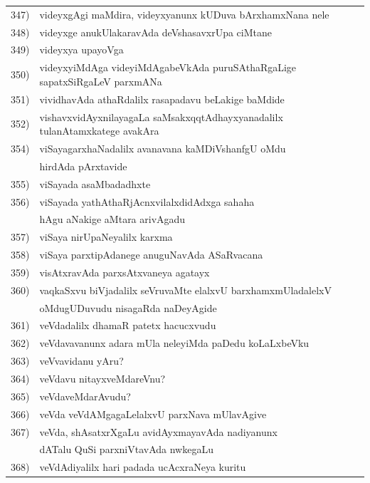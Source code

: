 {\begin{longtable}{@{}cp{7.4cm}r}
347) & videyxgAgi maMdira, videyxyanunx kUDuva bArxhamxNana nele & \pageref{page86}\\
348) & videyxge anukUlakaravAda deVshasavxrUpa ciMtane & \pageref{page93}\\
349) & videyxya upayoVga & \pageref{page86}\\
350) & videyxyiMdAga videyiMdAgabeVkAda puruSAthaRgaLige sapatxSiRgaLeV parxmANa &  \pageref{page89}\\
351) & vividhavAda athaRdalilx rasapadavu beLakige baMdide & \pageref{page217}\\
352) & vishavxvidAyxnilayagaLa saMsakxqqtAdhayxyanadalilx tulanAtamxkatege avakAra & \pageref{page44}\\
354) & viSayagarxhaNadalilx avanavana kaMDiVshanfgU oMdu & \\
     & hirdAda pArxtavide & \pageref{page291}\\
355) &  viSayada asaMbadadhxte & \pageref{page115}\\
356) & viSayada yathAthaRjAcnxvilalxdidAdxga sahaha & \\
     & hAgu aNakige aMtara arivAgadu & \pageref{page194}\\
357) & viSaya nirUpaNeyalilx karxma & \pageref{page131}\\
358) & viSaya parxtipAdanege anuguNavAda ASaRvacana & \pageref{page128}\\
359) & visAtxravAda parxsAtxvaneya agatayx & \pageref{page27}\\ 
360) & vaqkaSxvu biVjadalilx seVruvaMte elalxvU barxhamxmUladalelxV & \\
     & oMdugUDuvudu nisagaRda naDeyAgide & \pageref{page247}\\
361) & veVdadalilx dhamaR patetx hacucxvudu & \pageref{page124}\\
362) & veVdavavanunx adara mUla neleyiMda paDedu koLaLxbeVku & \pageref{page135}\\
363) & veVvavidanu yAru? & \pageref{page133}\\
364) & veVdavu nitayxveMdareVnu? & \pageref{page133}\\
365) & veVdaveMdarAvudu? & \pageref{page132}\\
366) & veVda veVdAMgagaLelalxvU parxNava mUlavAgive & \pageref{page165}\\
367) & veVda, shAsatxrXgaLu avidAyxmayavAda nadiyanunx  & \\
     & dATalu QuSi parxniVtavAda nwkegaLu & \pageref{page42}\\
 368) & veVdAdiyalilx hari padada ucAcxraNeya kuritu & \pageref{page149}\\

\end{longtable}}
